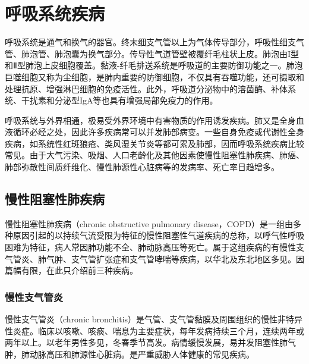 \chapter{呼吸系统疾病}


呼吸系统是通气和换气的器官。终末细支气管以上为气体传导部分，呼吸性细支气管、肺泡管、肺泡囊为换气部分。传导性气道管壁被覆纤毛柱状上皮。肺泡由I型和Ⅱ型肺泡上皮细胞覆盖。黏液-纤毛排送系统是呼吸道的主要防御功能之一。肺泡巨噬细胞又称为尘细胞，是肺内重要的防御细胞，不仅具有吞噬功能，还可摄取和处理抗原、增强淋巴细胞的免疫活性。此外，呼吸道分泌物中的溶菌酶、补体系统、干扰素和分泌型IgA等也具有增强局部免疫力的作用。

呼吸系统与外界相通，极易受外界环境中有害物质的作用诱发疾病。肺又是全身血液循环必经之处，因此许多疾病常可以并发肺部病变。一些自身免疫或代谢性全身疾病，如系统性红斑狼疮、类风湿关节炎等都可累及肺部，因而呼吸系统疾病比较常见。由于大气污染、吸烟、人口老龄化及其他因素使慢性阻塞性肺疾病、肺癌、肺部弥散性间质纤维化、慢性肺源性心脏病等的发病率、死亡率日趋增多。

\section{慢性阻塞性肺疾病}

慢性阻塞性肺疾病（chronic obstructive pulmonary
disease，COPD）是一组由多种原因引起的以持续气流受限为特征的慢性阻塞性气道疾病的总称，以呼气性呼吸困难为特征，病人常因肺功能不全、肺动脉高压等死亡。属于这组疾病的有慢性支气管炎、肺气肿、支气管扩张症和支气管哮喘等疾病，以华北及东北地区多见。因篇幅有限，在此只介绍前三种疾病。

\subsection{慢性支气管炎}

慢性支气管炎（chronic
bronchitis）是气管、支气管黏膜及周围组织的慢性非特异性炎症。临床以咳嗽、咳痰、喘息为主要症状，每年发病持续三个月，连续两年或两年以上。以老年男性多见，冬春季节高发。病情缓慢发展，易并发阻塞性肺气肿，肺动脉高压和肺源性心脏病。是严重威胁人体健康的常见疾病。

